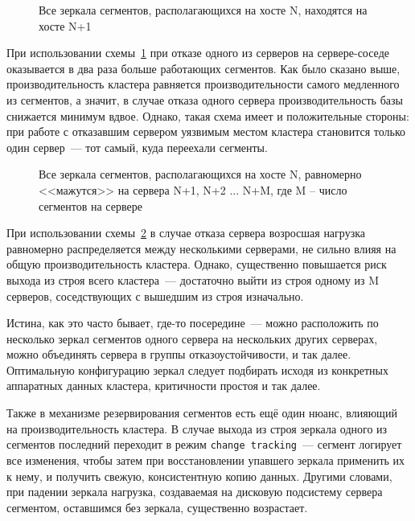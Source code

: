 \begin{figure}[ht!]
  \caption{Все зеркала сегментов, располагающихся на хосте N, находятся на хосте N+1}
  \label{fig:greenplum_reserve_one}
\end{figure}

При использовании схемы~\ref{fig:greenplum_reserve_one} при отказе одного из серверов на сервере-соседе оказывается в два раза больше работающих сегментов. Как было сказано выше, производительность кластера равняется производительности самого медленного из сегментов, а значит, в случае отказа одного сервера производительность базы снижается минимум вдвое. Однако, такая схема имеет и положительные стороны: при работе с отказавшим сервером уязвимым местом кластера становится только один сервер~--- тот самый, куда переехали сегменты.

\begin{figure}[ht!]
  \caption{Все зеркала сегментов, располагающихся на хосте N, равномерно <<мажутся>> на сервера N+1, N+2 ... N+M, где M – число сегментов на сервере}
  \label{fig:greenplum_reserve_two}
\end{figure}

При использовании схемы~\ref{fig:greenplum_reserve_two} в случае отказа сервера возросшая нагрузка равномерно распределяется между несколькими серверами, не сильно влияя на общую производительность кластера. Однако, существенно повышается риск выхода из строя всего кластера~--- достаточно выйти из строя одному из M серверов, соседствующих с вышедшим из строя изначально.

Истина, как это часто бывает, где-то посередине~--- можно расположить по несколько зеркал сегментов одного сервера на нескольких других серверах, можно объединять сервера в группы отказоустойчивости, и так далее. Оптимальную конфигурацию зеркал следует подбирать исходя из конкретных аппаратных данных кластера, критичности простоя и так далее.

Также в механизме резервирования сегментов есть ещё один нюанс, влияющий на производительность кластера. В случае выхода из строя зеркала одного из сегментов последний переходит в режим \lstinline!change tracking!~--- сегмент логирует все изменения, чтобы затем при восстановлении упавшего зеркала применить их к нему, и получить свежую, консистентную копию данных. Другими словами, при падении зеркала нагрузка, создаваемая на дисковую подсистему сервера сегментом, оставшимся без зеркала, существенно возрастает.

